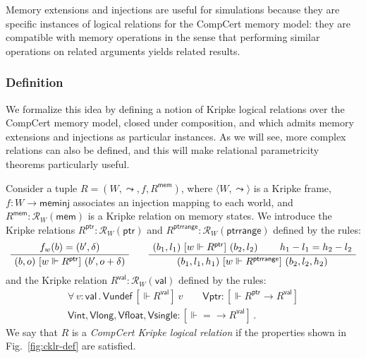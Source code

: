\documentclass[acmsmall,timestamp,review,anonymous]{acmart}
\newcommand{\kw}[1]{\ensuremath{ \mathsf{#1} }}
\newcommand{\ifr}[1]{\ [{#1}]\ }
\begin{document}
Memory extensions and injections
are useful for simulations
because they are specific instances
of logical relations for the CompCert memory model:
they are compatible with memory operations
in the sense that
performing similar operations on related arguments
yields related results.

\subsubsection{Definition}

We formalize this idea by defining
a notion of Kripke logical relations over the CompCert memory model,
closed under composition, and which
admits memory extensions and injections as particular instances.
As we will see,
more complex relations can also be defined,
and this will make relational parametricity theorems
particularly useful.

\begin{definition} \label{def:cklr} %
Consider a tuple $R = (W, \leadsto, f, R^\kw{mem})$,
where
$\langle W, \leadsto \rangle$ is a Kripke frame,
$f : W \rightarrow \kw{meminj}$
associates an injection mapping to each world, and
$R^\kw{mem} : \mathcal{R}_{W}(\kw{mem})$
is a Kripke relation on memory states.
We introduce the Kripke relations
$R^\kw{ptr} : \mathcal{R}_W(\kw{ptr})$ and
$R^\kw{ptrrange} : \mathcal{R}_W(\kw{ptrrange})$
defined by the rules:
\[
  \AxiomC{$f_w(b) = (b', \delta)$}
  \UnaryInfC{$(b, o) \ifr{w \Vdash R^\kw{ptr}} (b', o + \delta)$}
  \DisplayProof
  \qquad
  \AxiomC{$(b_1, l_1) \ifr{w \Vdash R^\kw{ptr}} (b_2, l_2)$}
  \AxiomC{$h_1 - l_1 = h_2 - l_2$}
  \BinaryInfC{$(b_1, l_1, h_1) \ifr{w \Vdash R^\kw{ptrrange}} (b_2, l_2, h_2)$}
  \DisplayProof
\]
and the Kripke relation
$R^\kw{val} : \mathcal{R}_W(\kw{val})$
defined by the rules:
\begin{gather*}
  \forall \, v : \kw{val} \,.\,
    \kw{Vundef} \ifr{\Vdash R^\kw{val}} v \qquad
  \kw{Vptr} : {}
    [\Vdash R^\kw{ptr} \rightarrow R^\kw{val}] \\
  \kw{Vint}, \kw{Vlong}, \kw{Vfloat}, \kw{Vsingle} :
    [\Vdash {=} \rightarrow R^\kw{val}] \,.
\end{gather*}
We say that $R$ is a \emph{CompCert Kripke logical relation}
if the properties shown in Fig.~\ref{fig:cklr-def} are satisfied.
\end{definition}
\end{document}
